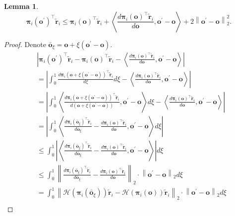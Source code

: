 \documentclass[10pt]{article}
\def\rvo{{\mathbf{o}}}
\def\rvo{{\mathbf{o}}}
\def\rvtilder{{\tilde{\mathbf{r}}}}
\newtheorem{lem}{Lemma}
\def\rvpi{{\boldsymbol{\pi}}}
\def\gH{{\mathcal{H}}}
\begin{document}
\begin{lem}
\begin{equation*}
    \rvpi_i\left( \rvo^\prime \right)^\top \rvtilder_i \le \rvpi_i\left( \rvo \right)^\top \rvtilder_i + \left\langle \frac{d \rvpi_i\left( \rvo \right)^\top \rvtilder_i}{d \rvo}, \rvo^\prime - \rvo \right\rangle + 2 \left\| \rvo^\prime - \rvo \right\|_2^2.
\end{equation*}
\end{lem}
\begin{proof}
Denote $\bar{\rvo}_\xi = \rvo + \xi \left( \rvo^\prime - \rvo \right)$.
\begin{equation*}
\begin{split}
    &\left| \rvpi_i\left( \rvo^\prime \right)^\top \rvtilder_i - \rvpi_i\left( \rvo \right)^\top \rvtilder_i - \left\langle \frac{d \rvpi_i\left( \rvo \right)^\top \rvtilder_i}{d \rvo}, \rvo^\prime - \rvo \right\rangle \right| \\
    &= \left| \int_0^1{ \frac{d \rvpi_i\left( \rvo + \xi \left( \rvo^\prime - \rvo \right) \right)^\top \rvtilder_i}{d \xi} d\xi} - \left\langle \frac{d \rvpi_i\left( \rvo \right)^\top \rvtilder_i}{d \rvo}, \rvo^\prime - \rvo \right\rangle \right| \\
    &= \left| \int_0^1{ \left\langle \frac{d \rvpi_i\left( \rvo + \xi \left( \rvo^\prime - \rvo \right) \right)^\top \rvtilder_i}{d \left( \rvo + \xi \left( \rvo^\prime - \rvo \right) \right)}, \rvo^\prime - \rvo \right\rangle d\xi} - \left\langle \frac{d \rvpi_i\left( \rvo \right)^\top \rvtilder_i}{d \rvo}, \rvo^\prime - \rvo \right\rangle \right| \\
    &= \left| \int_0^1{ \left\langle \frac{d \rvpi_i\left( \bar{\rvo}_\xi \right)^\top \rvtilder_i}{d \bar{\rvo}_\xi} - \frac{d \rvpi_i\left( \rvo \right)^\top \rvtilder_i}{d \rvo}, \rvo^\prime - \rvo \right\rangle d\xi} \right| \\
    &\le \int_0^1{ \left| \left\langle \frac{d \rvpi_i\left( \bar{\rvo}_\xi \right)^\top \rvtilder_i}{d \bar{\rvo}_\xi} - \frac{d \rvpi_i\left( \rvo \right)^\top \rvtilder_i}{d \rvo}, \rvo^\prime - \rvo \right\rangle \right| d\xi} \\
    &\le \int_0^1{ \left\| \frac{d \rvpi_i\left( \bar{\rvo}_\xi \right)^\top \rvtilder_i}{d \bar{\rvo}_\xi} - \frac{d \rvpi_i\left( \rvo \right)^\top \rvtilder_i}{d \rvo} \right\|_2 \cdot \left\| \rvo^\prime - \rvo \right\|_2 d\xi} \\
    &= \int_0^1{ \left\| \gH\left( \rvpi_i\left( \bar{\rvo}_\xi \right)\right) \rvtilder_i - \gH\left( \rvpi_i\left( \rvo \right)\right) \rvtilder_i \right\|_2 \cdot \left\| \rvo^\prime - \rvo \right\|_2 d\xi} \\

\end{split}
\end{equation*}
\end{proof}
\end{document}
